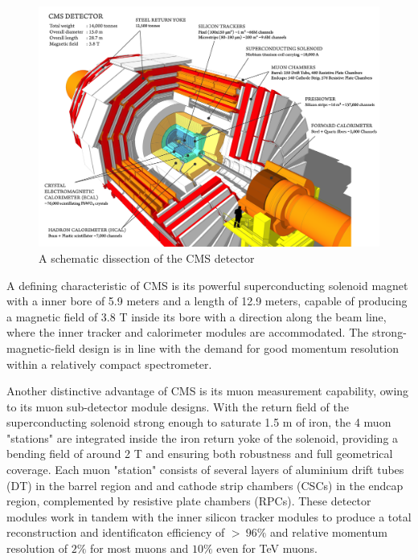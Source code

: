 \documentclass[10pt,twocolumn]{article}
\begin{document}
\begin{figure}[!htbp]
    \centering
    \includegraphics[width=1.0\linewidth]{images/CMS_disection_Run2.png}
    \caption{A schematic dissection of the CMS detector\cite{CMS_CUTAWAY_DIAGRAM}}
    \label{fig:CMS-disection}
\end{figure}

A defining characteristic of CMS is its powerful superconducting solenoid magnet with a inner bore of 5.9 meters and a length of 12.9 meters, capable of producing a magnetic field of 3.8 T inside its bore with a direction along the beam line, where the inner tracker and calorimeter modules are accommodated. The strong-magnetic-field design is in line with the demand for good momentum resolution within a relatively compact spectrometer.\cite{CMS_JINST_2008}

Another distinctive advantage of CMS is its muon measurement capability, owing to its muon sub-detector module designs. With the return field of the superconducting solenoid strong enough to saturate 1.5 m of iron, the 4 muon "stations" are integrated inside the iron return yoke of the solenoid, providing a bending field of around 2 T and ensuring both robustness and full geometrical coverage. Each muon "station" consists of several layers of aluminium drift tubes (DT) in the barrel region and and cathode strip chambers (CSCs) in the endcap region, complemented by resistive plate chambers (RPCs). These detector modules work in tandem with the inner silicon tracker modules to produce a total reconstruction and identificaton efficiency of $> ~ 96\%$ and relative momentum resolution of $2\%$ for most muons and $10\%$ even for TeV muons.\cite{CMS_MUON_PERF_13TEV}
\end{document}
